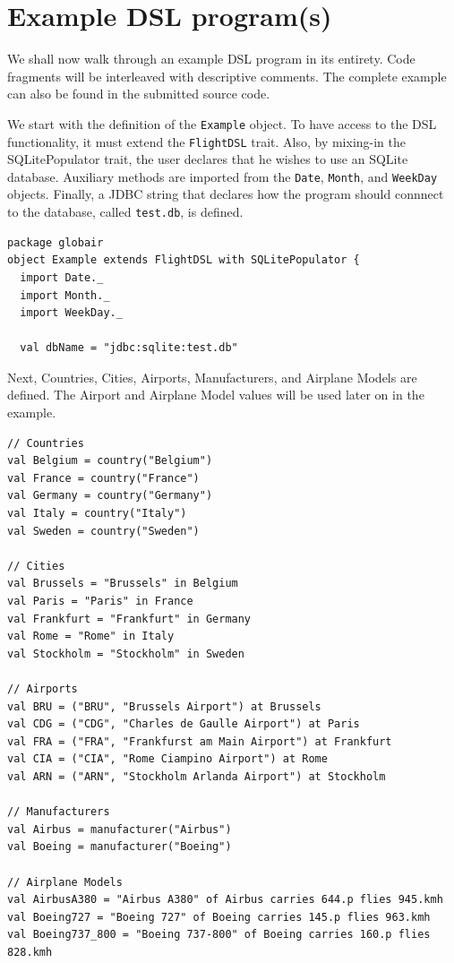 \documentclass[a4paper]{article}
\newcommand{\cc}[1]{\texttt{#1}}
\begin{document}
\clearpage
\section{Example DSL program(s)}
\label{sec:example-dsl-programs}


We shall now walk through an example DSL program in its entirety.
Code fragments will be interleaved with descriptive comments.
The complete example can also be found in the submitted source code.


We start with the definition of the \cc{Example} object.
To have access to the DSL functionality, it must extend the \cc{FlightDSL} trait.
Also, by mixing-in the SQLitePopulator trait, the user declares that he wishes to use an SQLite database.
Auxiliary methods are imported from the \cc{Date}, \cc{Month}, and \cc{WeekDay} objects.
Finally, a JDBC string that declares how the program should connnect to the database, called \cc{test.db}, is defined.

\begin{lstlisting}
package globair
object Example extends FlightDSL with SQLitePopulator {
  import Date._
  import Month._
  import WeekDay._

  val dbName = "jdbc:sqlite:test.db"
\end{lstlisting}

Next, Countries, Cities, Airports, Manufacturers, and Airplane Models are defined.
The Airport and Airplane Model values will be used later on in the example.

\begin{lstlisting}
// Countries
val Belgium = country("Belgium")
val France = country("France")
val Germany = country("Germany")
val Italy = country("Italy")
val Sweden = country("Sweden")

// Cities
val Brussels = "Brussels" in Belgium
val Paris = "Paris" in France
val Frankfurt = "Frankfurt" in Germany
val Rome = "Rome" in Italy
val Stockholm = "Stockholm" in Sweden

// Airports
val BRU = ("BRU", "Brussels Airport") at Brussels
val CDG = ("CDG", "Charles de Gaulle Airport") at Paris
val FRA = ("FRA", "Frankfurst am Main Airport") at Frankfurt
val CIA = ("CIA", "Rome Ciampino Airport") at Rome
val ARN = ("ARN", "Stockholm Arlanda Airport") at Stockholm

// Manufacturers
val Airbus = manufacturer("Airbus")
val Boeing = manufacturer("Boeing")

// Airplane Models
val AirbusA380 = "Airbus A380" of Airbus carries 644.p flies 945.kmh
val Boeing727 = "Boeing 727" of Boeing carries 145.p flies 963.kmh
val Boeing737_800 = "Boeing 737-800" of Boeing carries 160.p flies 828.kmh
\end{lstlisting}
\end{document}

